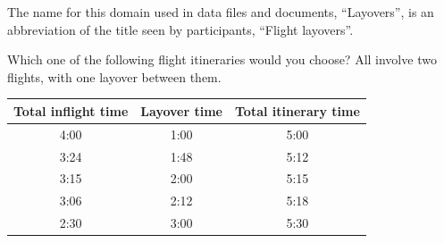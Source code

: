 The name for this domain used in data files and documents, ``Layovers'', is an abbreviation of the title seen by participants, ``Flight layovers''.

\begin{tcolorbox}
Which one of the following flight itineraries would you choose?
All involve two flights, with one layover between them.

\begin{tabular}{ccc}
\hline
Total inflight time & Layover time & Total itinerary time \\ \hline
4:00 & 1:00 & 5:00 \\ 
3:24 & 1:48 & 5:12 \\ 
3:15 & 2:00 & 5:15 \\ 
3:06 & 2:12 & 5:18 \\ 
2:30 & 3:00 & 5:30 \\ \hline
\end{tabular}
\end{tcolorbox}
